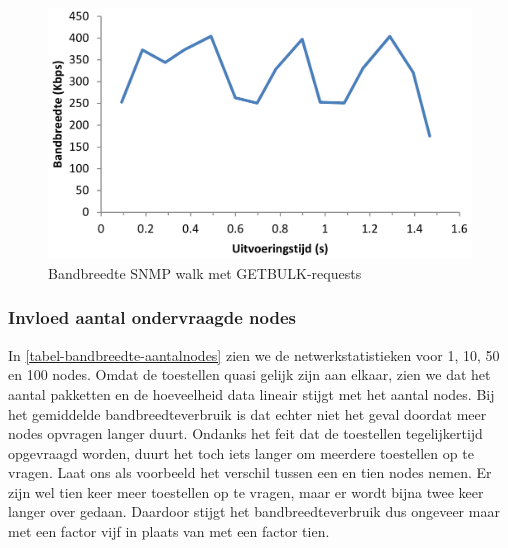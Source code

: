 \begin{figure}[h]
	\centering
	\includegraphics[scale=0.40]{figures/bandbreedte/snmpbulkwalk}
	\caption{Bandbreedte SNMP walk met GETBULK-requests}
	\label{fig-bandbreedte-bulkwalk}
\end{figure}


\subsubsection{Invloed aantal ondervraagde nodes}

In \cref{tabel-bandbreedte-aantalnodes} zien we de netwerkstatistieken voor 1, 10, 50 en 100 nodes.
Omdat de toestellen quasi gelijk zijn aan elkaar, zien we dat het aantal pakketten en de hoeveelheid data lineair stijgt met het aantal nodes.
Bij het gemiddelde bandbreedteverbruik is dat echter niet het geval doordat meer nodes opvragen langer duurt.
Ondanks het feit dat de toestellen tegelijkertijd opgevraagd worden, duurt het toch iets langer om meerdere toestellen op te vragen.
Laat ons als voorbeeld het verschil tussen een en tien nodes nemen.
Er zijn wel tien keer meer toestellen op te vragen, maar er wordt bijna twee keer langer over gedaan.
Daardoor stijgt het bandbreedteverbruik dus ongeveer maar met een factor vijf in plaats van met een factor tien.

